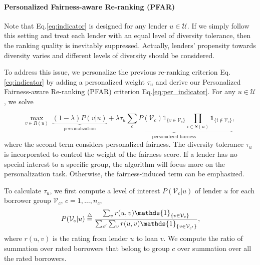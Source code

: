 \paragraph{\textbf{Personalized Fairness-aware Re-ranking (PFAR)}}
Note that Eq.\eqref{eq:indicator} is designed for any lender $u\in \mathcal U$. If we simply follow this setting and treat each lender with an equal level of diversity tolerance, then the ranking quality is inevitably suppressed. Actually, lenders' propensity towards diversity varies and different levels of diversity should be considered.

To address this issue, we personalize the previous re-ranking criterion Eq.\eqref{eq:indicator} by adding a personalized weight $\tau_u$ and derive our Personalized Fairness-aware Re-ranking (PFAR) criterion Eq.\eqref{eq:per_indicator}. 
For any $u\in \mathcal U$, we solve

\begin{equation}
\max_{v\in R(u)}\;\underbrace{(1-\lambda)P(v|u)}_{\text{personalization}} + \underbrace{\lambda\tau_u\sum_{c}P(\mathcal V_c)\mathds{1}_{\{v\in \mathcal V_c\}}\prod_{i\in S(u)}\mathds{1}_{\{i\notin \mathcal V_c\}}}_{\text{personalized fairness}},\; %
\label{eq:per_indicator}
\end{equation}
where the second term considers personalized fairness. The diversity tolerance $\tau_u$ is incorporated to control the weight of the fairness score. If a lender has no special interest to a specific group, the algorithm will focus more on the personalization task. Otherwise, the fairness-induced term can be emphasized.


To calculate $\tau_u$, we first compute a level of interest $P(\mathcal V_c|u)$ of lender $u$ for each borrower group $\mathcal V_c$, $c=1,\ldots,n_c$,
\begin{equation}
P(\mathcal V_c|u)\buildrel\triangle\over=\frac{\sum_vr(u,v)\mathds{1}_{\{v\in \mathcal V_c\}}}{\sum_{c'}\sum_vr(u,v)\mathds{1}_{\{v\in \mathcal V_{c'}\}}},
\end{equation}
where $r(u,v)$ is the rating from lender $u$ to loan $v$. We compute the ratio of summation over rated borrowers that belong to group $c$ over summation over all the rated borrowers. 

